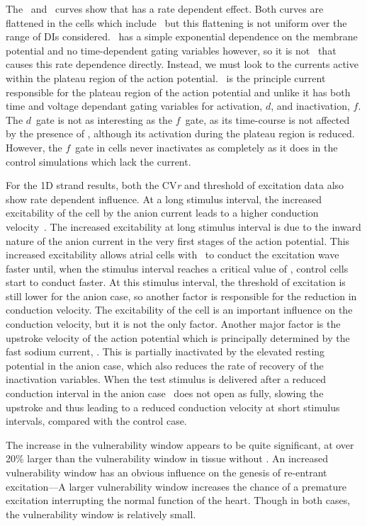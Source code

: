 The \apdr[50]\ and \apdr\ curves show that  has a rate dependent
effect.  Both curves are flattened in the cells which include \, but
this flattening is not uniform over the range of DIs considered.
\ has a simple exponential dependence on the membrane potential and no
time-dependent gating variables however, so it is not \ that causes
this rate dependence directly.
Instead, we must look to the currents active within the plateau region of the
action potential.
\ is the principle current responsible for the plateau region of the
action potential and unlike  it has both time and voltage dependant
gating variables for activation, $d$, and inactivation, $f$.
The $d$\ gate is not as interesting as the $f$\ gate, as its time-course is not
affected by the presence of , although its activation during the
plateau region is reduced.
However, the $f$\ gate in  cells never inactivates as completely as
it does in the control simulations which lack the current.

For the 1D strand results, both the CV\emph{r} and threshold of
excitation data also show rate dependent influence.
At a long stimulus interval, the increased excitability of the cell by the anion
current leads to a higher conduction velocity~\cite{Nygren2000}.
The increased excitability at long stimulus interval is due to the inward nature
of the anion current in the very first stages of the action potential.
This increased excitability allows atrial cells with \ to conduct the
excitation wave faster until, when the stimulus interval reaches a critical value of
, control cells start to conduct faster.
At this stimulus interval, the threshold of excitation is still lower for the
anion case, so another factor is responsible for the reduction in conduction
velocity.
The excitability of the cell is an important influence on the conduction
velocity, but it is not the only factor.
Another major factor is the upstroke velocity of the action potential which is principally
determined by the fast sodium current, .
This is partially inactivated by the elevated resting potential in the anion
case, which also reduces the rate of recovery of the inactivation variables.
When the test stimulus is delivered after a reduced conduction interval in the
anion case \ does not open as fully, slowing the upstroke and thus
leading to a reduced conduction velocity at short stimulus intervals, compared
with the control case.

The increase in the
vulnerability window appears to be quite significant, at over 20\% larger than
the vulnerability window in tissue without .
An increased vulnerability window has an obvious influence on the genesis of
re-entrant excitation---A larger vulnerability window increases the chance of a
premature excitation interrupting the normal function of the heart.
Though in both cases, the vulnerability window is relatively small.


